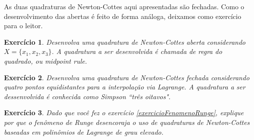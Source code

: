 \documentclass[]{article}
\newtheorem{exercicio}{Exercício}
\numberwithin{equation}{section}
\begin{document}
As duas quadraturas de Newton-Cottes aqui apresentadas são fechadas. Como o desenvolvimento das abertas é feito de forma análoga, deixamos como exercício para o leitor.

\begin{exercicio}
	Desenvolva uma quadratura de Newton-Cottes aberta considerando $X = \{x_1, x_2, x_3\}$. A quadratura a ser desenvolvida é chamada de regra do quadrado, ou \emph{midpoint rule}.
\end{exercicio}

\begin{exercicio}
	Desenvolva uma quadratura de Newton-Cottes fechada considerando quatro pontos equidistantes para a interpolação via Lagrange. A quadratura a ser dessenvolvida é conhecida como Simpson ``três oitavos".
\end{exercicio}

\begin{exercicio}
	Dado que você fez o exercício \ref{exercicioFenomenoRunge}, explique por que o fenômeno de Runge desencoraja o uso de quadraturas de Newton-Cottes baseadas em polinômios de Lagrange de grau elevado.
\end{exercicio}
\end{document}
